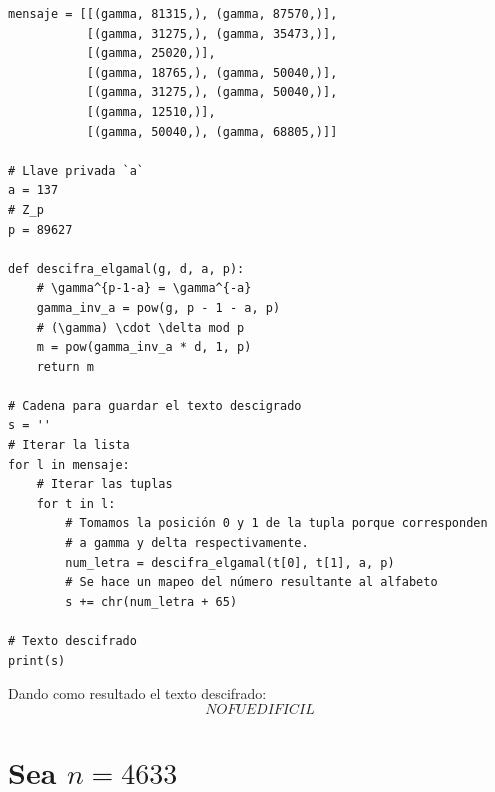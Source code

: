 \documentclass[11pt,letterpaper]{article}
\begin{document}
\begin{enumerate}[label=\alph*)]
\begin{verbatim}
mensaje = [[(gamma, 81315,), (gamma, 87570,)],
           [(gamma, 31275,), (gamma, 35473,)],
           [(gamma, 25020,)],
           [(gamma, 18765,), (gamma, 50040,)],
           [(gamma, 31275,), (gamma, 50040,)],
           [(gamma, 12510,)],
           [(gamma, 50040,), (gamma, 68805,)]]

# Llave privada `a`
a = 137
# Z_p
p = 89627

def descifra_elgamal(g, d, a, p):
    # \gamma^{p-1-a} = \gamma^{-a}
    gamma_inv_a = pow(g, p - 1 - a, p)
    # (\gamma) \cdot \delta mod p
    m = pow(gamma_inv_a * d, 1, p)
    return m

# Cadena para guardar el texto descigrado
s = ''
# Iterar la lista
for l in mensaje:
    # Iterar las tuplas
    for t in l:
        # Tomamos la posición 0 y 1 de la tupla porque corresponden
        # a gamma y delta respectivamente.
        num_letra = descifra_elgamal(t[0], t[1], a, p)
        # Se hace un mapeo del número resultante al alfabeto
        s += chr(num_letra + 65)

# Texto descifrado
print(s)

\end{verbatim}
Dando como resultado el texto descifrado:
$$NOFUEDIFICIL$$

\end{enumerate}

\section{Sea $n = 4633$}
\end{document}
